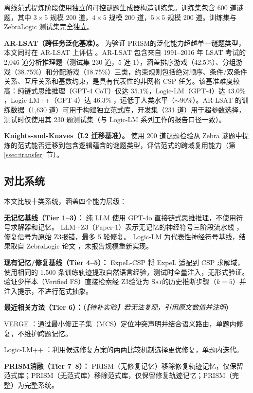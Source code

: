 \documentclass[UTF8,a4paper,12pt]{ctexart}
\newcommand{\PRISM}{PRISM}
\newcommand{\sat}{\textsc{Sat}}
\newcommand{\zthree}{Z3}
\begin{document}
离线范式提炼阶段使用独立的可控谜题生成器构造训练集。训练集包含 600 道谜题，其中 \(3\times5\) 规模 200 道，\(4\times5\) 规模 200 道，\(5\times5\) 规模 200 道。训练集与 ZebraLogic 测试集完全独立。

\textbf{AR-LSAT（跨任务泛化基准）。} 为验证 \PRISM 的泛化能力超越单一谜题类型，本文同时在 AR-LSAT 上评估 \cite{zhong2022}。AR-LSAT 包含来自 1991--2016 年 LSAT 考试的 2,046 道分析推理题（测试集 230 道，5 选 1），涵盖排序游戏（42.5\%）、分组游戏（38.75\%）和分配游戏（18.75\%）三类，约束规则包括绝对顺序、条件/双条件关系、互斥关系和基数约束，是具有代表性的非网格 CSP 任务。该基准难度较高：纯链式思维推理（GPT-4 CoT）仅达 \(35.1\%\)，Logic-LM（GPT-4）达 \(43.0\%\)，Logic-LM++（GPT-4）达 \(46.3\%\) \cite{pan2023,kirtania2024}，远低于人类水平（\(\sim90\%\)）。AR-LSAT 的训练数据（1,630 道）可用于构建独立范式库，开发集（231 道）用于超参数选择，测试时仅使用其 230 题测试集（与 Logic-LM 系列工作的报告口径一致）。

\textbf{Knights-and-Knaves（L2 迁移基准）。} 使用 200 道谜题检验从 Zebra 谜题中提炼的范式能否迁移到包含逻辑蕴含的谜题类型，评估范式的跨域复用能力（第 \ref{ssec:transfer} 节）。

\subsection{对比系统}

本文比较十类系统，涵盖四个能力层级：

\textbf{无记忆基线（Tier 1–3）：}
纯 LLM 使用 GPT-4o 直接链式思维推理，不使用符号求解器和记忆。
LLM+\zthree（Paper-1）表示无记忆的神经符号三阶段流水线 \cite{olausson2023}，修复信号为原始 \zthree 报错，最多 5 轮修复。
Logic-LM 为代表性神经符号基线，结果取自 ZebraLogic 论文 \cite{lin2025}，未报告规模重新实现。

\textbf{现有记忆/修复基线（Tier 4–5）：}
ExpeL-CSP 将 ExpeL \cite{zhao2024} 适配到 CSP 求解域，使用相同的 1,500 条训练轨迹提取自然语言经验，测试时全量注入，无形式验证。
验证少样本（Verified FS）直接检索经 \zthree 验证为 \sat 的历史推断步骤（\(k=5\)）并注入提示，不进行范式抽象。

\textbf{最近相关方法（Tier 6）：}（\textit{【待补实验】若无法复现，引用原文数值并注明}）

VERGE \cite{singh2026}：通过最小修正子集（MCS）定位冲突声明并结合语义路由，单题内修复，不维护跨题记忆。

Logic-LM++ \cite{kirtania2024}：利用候选修复方案的两两比较机制选择更优修复，单题内迭代。

\textbf{\PRISM 消融（Tier 7–8）：}
\PRISM（无修复记忆）移除修复轨迹记忆，仅保留范式库；\PRISM（无范式库）移除范式库，仅保留修复轨迹记忆；\PRISM（完整）为完整系统。
\end{document}
